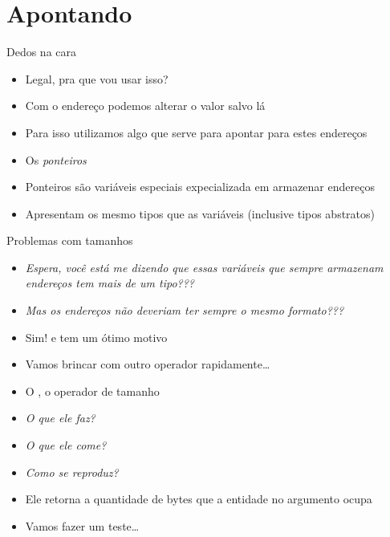 \documentclass[14pt]{beamer}
\begin{document}
	\section{Apontando}
		\begin{frame}{Dedos na cara}
			\begin{itemize}
				\presentationPause\item Legal, pra que vou usar isso?
				\presentationPause\item Com o endereço podemos alterar o valor salvo lá
				\presentationPause\item Para isso utilizamos algo que serve para apontar para estes endereços
				\presentationPause\item Os \emph{ponteiros}
				\presentationPause\item Ponteiros são variáveis especiais expecializada em armazenar endereços
				\presentationPause\item Apresentam os mesmo tipos que as variáveis \presentationPause (inclusive tipos abstratos)
			\end{itemize}
		\end{frame}

		\begin{frame}{Problemas com tamanhos}
			\begin{itemize}
				\presentationPause\item \textit{Espera, você está me dizendo \presentationPause que essas variáveis que sempre armazenam endereços \presentationPause tem mais de um tipo???}
				\presentationPause\item \textit{Mas os endereços não deveriam ter sempre o mesmo formato???}
				\presentationPause\item Sim! \presentationPause e tem um ótimo motivo
				\presentationPause\item Vamos brincar com outro operador rapidamente\dots
				\presentationPause\item O , o operador de tamanho
			\end{itemize}
			\presentationPause
			\begin{multicols}{3}
				\begin{itemize}
					\presentationPause\item \textit{O que ele faz?}
					\presentationPause\item \textit{O que ele come?}
					\presentationPause\item \textit{Como se reproduz?}
				\end{itemize}
			\end{multicols}
			\begin{itemize}
				\presentationPause\item Ele retorna a quantidade de bytes que a entidade no argumento ocupa
				\presentationPause\item Vamos fazer um teste\dots
			\end{itemize}
		\end{frame}
\end{document}
